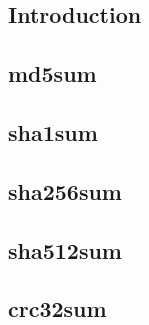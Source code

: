 
\subsection{Introduction}
 
\subsection{md5sum}

\subsection{sha1sum}

\subsection{sha256sum}

\subsection{sha512sum}

\subsection{crc32sum}

